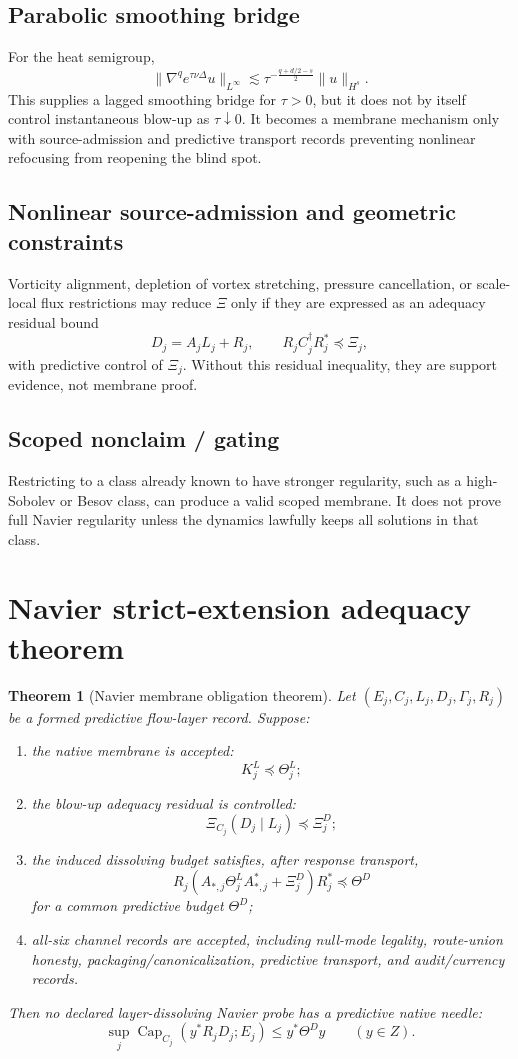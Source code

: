 \documentclass[11pt]{article}
\newtheorem{theorem}{Theorem}
\begin{document}
\subsection{Parabolic smoothing bridge}
For the heat semigroup,
\[
\|\nabla^q e^{\tau\nu\Delta}u\|_{L^\infty}
\lesssim
\tau^{-\frac{q+d/2-s}{2}}\|u\|_{H^s}.
\]
This supplies a lagged smoothing bridge for $\tau>0$, but it does not by itself control instantaneous blow-up as $\tau\downarrow0$. It becomes a membrane mechanism only with source-admission and predictive transport records preventing nonlinear refocusing from reopening the blind spot.

\subsection{Nonlinear source-admission and geometric constraints}
Vorticity alignment, depletion of vortex stretching, pressure cancellation, or scale-local flux restrictions may reduce $\Xi$ only if they are expressed as an adequacy residual bound
\[
D_j=A_jL_j+R_j,
\qquad
R_jC_j^{\dagger}R_j^*\preceq \Xi_j,
\]
with predictive control of $\Xi_j$. Without this residual inequality, they are support evidence, not membrane proof.

\subsection{Scoped nonclaim / gating}
Restricting to a class already known to have stronger regularity, such as a high-Sobolev or Besov class, can produce a valid scoped membrane. It does not prove full Navier regularity unless the dynamics lawfully keeps all solutions in that class.

\section{Navier strict-extension adequacy theorem}
\begin{theorem}[Navier membrane obligation theorem]
Let $(E_j,C_j,L_j,D_j,\Gamma_j,R_j)$ be a formed predictive flow-layer record. Suppose:
\begin{enumerate}
\item the native membrane is accepted:
\[
K^L_j\preceq\Theta^L_j;
\]
\item the blow-up adequacy residual is controlled:
\[
\Xi_{C_j}(D_j\mid L_j)\preceq\Xi^D_j;
\]
\item the induced dissolving budget satisfies, after response transport,
\[
R_j\left(A_{*,j}\Theta^L_jA_{*,j}^*+\Xi^D_j\right)R_j^*\preceq\Theta^D
\]
for a common predictive budget $\Theta^D$;
\item all-six channel records are accepted, including null-mode legality, route-union honesty, packaging/canonicalization, predictive transport, and audit/currency records.
\end{enumerate}
Then no declared layer-dissolving Navier probe has a predictive native needle:
\[
\sup_j\operatorname{Cap}_{C_j}(y^*R_jD_j;E_j)\le y^*\Theta^D y
\qquad(y\in Z).
\]
\end{theorem}
\end{document}
